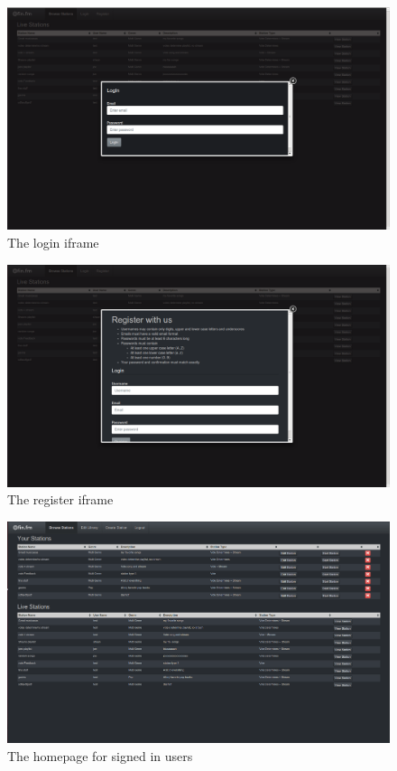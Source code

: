\documentclass[a4paper, 12pt]{report}
\begin{document}
\begin{figure}[H]
  \centering
    \includegraphics[width=1.0\textwidth]{screenshots/login.png}
    \caption{The login iframe}
    \label{login}
\end{figure}
\begin{figure}[H]
  \centering
    \includegraphics[width=1.0\textwidth]{screenshots/register.png}
    \caption{The register iframe}
    \label{register}
\end{figure}
\begin{figure}[H]
  \centering
    \includegraphics[width=1.0\textwidth]{screenshots/homepage.png}
    \caption{The homepage for signed in users}
    \label{homepage}
\end{figure}
\end{document}
